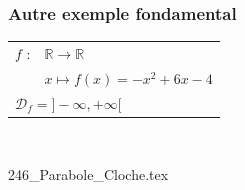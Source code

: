 \newpage

\vspace*{-1cm}

\subsubsection{Autre exemple fondamental}

\begin{tabular}{l@{$\;$ }l}
 $f$ : & $ \mathbb{R} \longrightarrow \mathbb{R}$\\
        & $ x \longmapsto f(x) = -x^2 +6x -4$ \\
\multicolumn{2}{l}{$\mathscr{D}_f = ]-\infty, +\infty [ $ }       \\
\end{tabular}\\


\centerline{ {246_Parabole_Cloche.tex}}

\bigskip 


